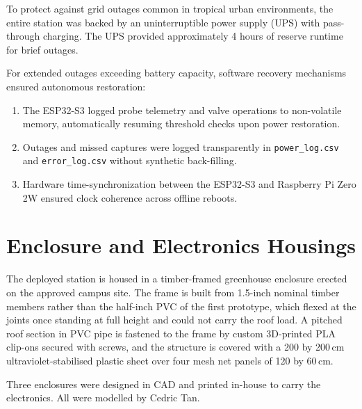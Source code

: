 To protect against grid outages common in tropical urban environments, the entire station was backed by an uninterruptible power supply (UPS) with pass-through charging. The UPS provided approximately 4 hours of reserve runtime for brief outages.

For extended outages exceeding battery capacity, software recovery mechanisms ensured autonomous restoration:
\begin{enumerate}
    \item The ESP32-S3 logged probe telemetry and valve operations to non-volatile memory, automatically resuming threshold checks upon power restoration.
    \item Outages and missed captures were logged transparently in \texttt{power\_log.csv} and \texttt{error\_log.csv} without synthetic back-filling.
    \item Hardware time-synchronization between the ESP32-S3 and Raspberry Pi Zero 2W ensured clock coherence across offline reboots.
\end{enumerate}


\section{Enclosure and Electronics Housings}
\label{sec:enclosures}

The deployed station is housed in a timber-framed greenhouse enclosure erected
on the approved campus site. The frame is built from 1.5-inch nominal timber
members rather than the half-inch PVC of the first prototype, which flexed at
the joints once standing at full height and could not carry the roof load. A
pitched roof section in PVC pipe is fastened to the frame by custom
3D-printed PLA clip-ons secured with screws, and the structure is covered with
a 200 by 200\,cm ultraviolet-stabilised plastic sheet over four mesh net
panels of 120 by 60\,cm.

Three enclosures were designed in CAD and printed in-house to carry the
electronics. All were modelled by Cedric Tan.

